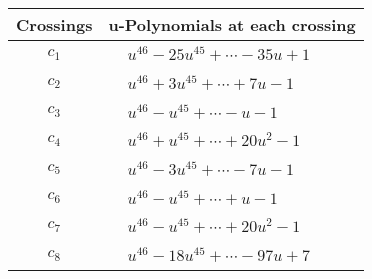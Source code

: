 \documentclass[1p]{elsarticle_modified}
\theoremstyle{definition}
\begin{document}
\begin{tabular}{m{50pt}|m{274pt}}
Crossings & \hspace{64pt}u-Polynomials at each crossing \\
\hline $$\begin{aligned}c_{1}\end{aligned}$$&$\begin{aligned}
&u^{46}-25 u^{45}+\cdots-35 u+1
\end{aligned}$\\
\hline $$\begin{aligned}c_{2}\end{aligned}$$&$\begin{aligned}
&u^{46}+3 u^{45}+\cdots+7 u-1
\end{aligned}$\\
\hline $$\begin{aligned}c_{3}\end{aligned}$$&$\begin{aligned}
&u^{46}- u^{45}+\cdots- u-1
\end{aligned}$\\
\hline $$\begin{aligned}c_{4}\end{aligned}$$&$\begin{aligned}
&u^{46}+u^{45}+\cdots+20 u^2-1
\end{aligned}$\\
\hline $$\begin{aligned}c_{5}\end{aligned}$$&$\begin{aligned}
&u^{46}-3 u^{45}+\cdots-7 u-1
\end{aligned}$\\
\hline $$\begin{aligned}c_{6}\end{aligned}$$&$\begin{aligned}
&u^{46}- u^{45}+\cdots+u-1
\end{aligned}$\\
\hline $$\begin{aligned}c_{7}\end{aligned}$$&$\begin{aligned}
&u^{46}- u^{45}+\cdots+20 u^2-1
\end{aligned}$\\
\hline $$\begin{aligned}c_{8}\end{aligned}$$&$\begin{aligned}
&u^{46}-18 u^{45}+\cdots-97 u+7
\end{aligned}$\\

\end{tabular}
\end{document}
